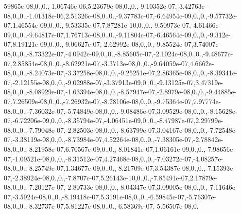 \begin{DoxyCompactItemize}
\-59865e-\/08,0.,0.,-\/1.\-06746e-\/06,5.\-23679e-\/08,0.,0.,-\/9.\-10352e-\/07,-\/3.\-42763e-\/08,0.,0.,-\/1.\-01318e-\/06,2.\-51326e-\/08,0.,0.,-\/9.\-37783e-\/07,-\/6.\-64954e-\/09,0.,0.,-\/9.\-57732e-\/07,1.\-46554e-\/09,0.,0.,-\/9.\-53335e-\/07,7.\-87281e-\/10,0.,0.,-\/9.\-50973e-\/07,-\/4.\-61466e-\/09,0.,0.,-\/9.\-64817e-\/07,1.\-76713e-\/08,0.,0.,-\/9.\-11804e-\/07,-\/6.\-46564e-\/09,0.,0.,-\/9.\-312e-\/07,8.\-19121e-\/09,0.,0.,-\/9.\-06627e-\/07,-\/2.\-62992e-\/08,0.,0.,-\/9.\-85524e-\/07,3.\-74007e-\/08,0.,0.,-\/8.\-73322e-\/07,-\/4.\-0942e-\/09,0.,0.,-\/8.\-85605e-\/07,-\/2.\-1024e-\/08,0.,0.,-\/9.\-48677e-\/07,2.\-85854e-\/08,0.,0.,-\/8.\-62921e-\/07,-\/3.\-3713e-\/08,0.,0.,-\/9.\-64059e-\/07,4.\-6662e-\/08,0.,0.,-\/8.\-24073e-\/07,-\/3.\-37258e-\/08,0.,0.,-\/9.\-25251e-\/07,2.\-86365e-\/08,0.,0.,-\/8.\-39341e-\/07,-\/2.\-12155e-\/08,0.,0.,-\/9.\-02988e-\/07,-\/3.\-37913e-\/09,0.,0.,-\/9.\-13125e-\/07,3.\-47319e-\/08,0.,0.,-\/8.\-08929e-\/07,-\/1.\-63394e-\/08,0.,0.,-\/8.\-57947e-\/07,-\/2.\-8979e-\/08,0.,0.,-\/9.\-44885e-\/07,7.\-26509e-\/08,0.,0.,-\/7.\-26932e-\/07,-\/8.\-28106e-\/08,0.,0.,-\/9.\-75364e-\/07,7.\-97774e-\/08,0.,0.,-\/7.\-36032e-\/07,-\/5.\-74849e-\/08,0.,0.,-\/9.\-08486e-\/07,3.\-09529e-\/08,0.,0.,-\/8.\-15628e-\/07,-\/6.\-72206e-\/09,0.,0.,-\/8.\-35794e-\/07,-\/4.\-06451e-\/09,0.,0.,-\/8.\-47987e-\/07,2.\-29799e-\/08,0.,0.,-\/7.\-79048e-\/07,-\/2.\-82503e-\/08,0.,0.,-\/8.\-63799e-\/07,3.\-04167e-\/08,0.,0.,-\/7.\-72548e-\/07,-\/3.\-38119e-\/08,0.,0.,-\/8.\-73984e-\/07,4.\-52264e-\/08,0.,0.,-\/7.\-38305e-\/07,-\/2.\-78842e-\/08,0.,0.,-\/8.\-21958e-\/07,6.\-70567e-\/09,0.,0.,-\/8.\-01841e-\/07,1.\-06161e-\/09,0.,0.,-\/7.\-98656e-\/07,-\/1.\-09521e-\/08,0.,0.,-\/8.\-31512e-\/07,4.\-27468e-\/08,0.,0.,-\/7.\-03272e-\/07,-\/4.\-08257e-\/08,0.,0.,-\/8.\-25749e-\/07,1.\-34677e-\/09,0.,0.,-\/8.\-21709e-\/07,3.\-54387e-\/08,0.,0.,-\/7.\-15393e-\/07,-\/2.\-38924e-\/08,0.,0.,-\/7.\-8707e-\/07,5.\-26143e-\/10,0.,0.,-\/7.\-85491e-\/07,2.\-17879e-\/08,0.,0.,-\/7.\-20127e-\/07,-\/2.\-80733e-\/08,0.,0.,-\/8.\-04347e-\/07,3.\-09005e-\/08,0.,0.,-\/7.\-11646e-\/07,-\/3.\-5924e-\/08,0.,0.,-\/8.\-19418e-\/07,5.\-3191e-\/08,0.,0.,-\/6.\-59845e-\/07,-\/5.\-76307e-\/08,0.,0.,-\/8.\-32737e-\/07,5.\-81227e-\/08,0.,0.,-\/6.\-58369e-\/07,-\/5.\-56507e-\/08,0.\-
\end{DoxyCompactItemize}
